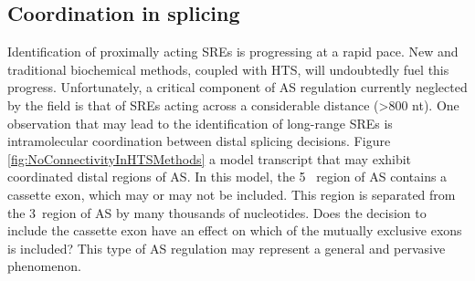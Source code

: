 
\subsection{Coordination in splicing}\label{sec: Coordination in splicing}



Identification of proximally acting SREs is progressing at a rapid pace. New and traditional biochemical methods, coupled with HTS, will undoubtedly fuel this progress. Unfortunately, a critical component of AS regulation currently neglected by the field is that of SREs acting across a considerable distance (>800 nt). One observation that may lead to the identification of long-range SREs is intramolecular coordination between distal splicing decisions. Figure \ref{fig:NoConnectivityInHTSMethods} a model transcript that may exhibit coordinated distal regions of AS. In this model, the 5\textprime~ region of AS contains a cassette exon, which may or may not be included. This region is separated from the 3\textprime~region of AS by many thousands of nucleotides. Does the decision to include the cassette exon have an effect on which of the mutually exclusive exons is included? This type of AS regulation may represent a general and pervasive phenomenon.

